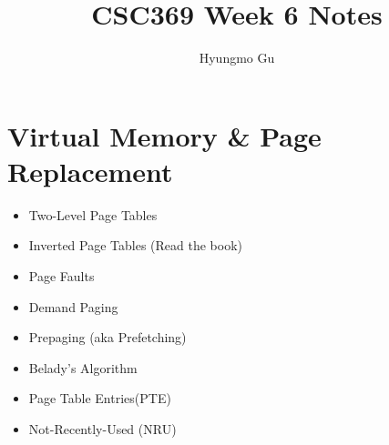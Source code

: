 \documentclass[12pt]{article}
\begin{document}
\title{CSC369 Week 6 Notes}
\author{Hyungmo Gu}
\maketitle

\bigskip

\section{Virtual Memory \& Page Replacement}

\bigskip

\begin{itemize}
    \item Two-Level Page Tables
    \item Inverted Page Tables (Read the book)
    \item Page Faults
    \item Demand Paging
    \item Prepaging (aka Prefetching)
    \item Belady's Algorithm
    \item Page Table Entries(PTE)
    \item Not-Recently-Used (NRU)

\end{itemize}
\end{document}
